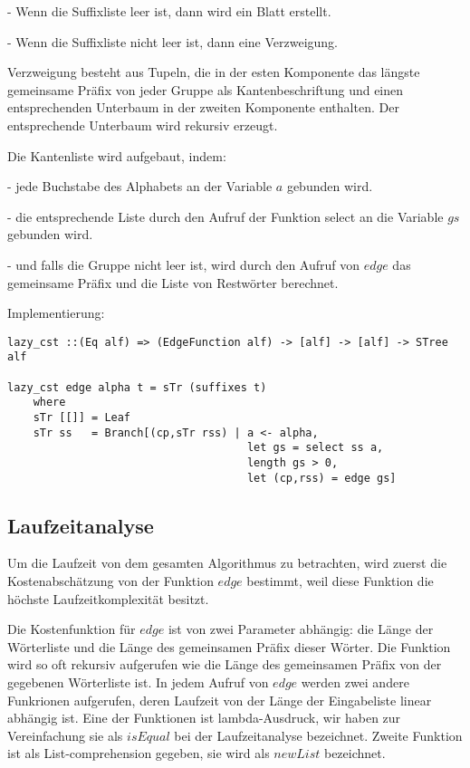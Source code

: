 \documentclass[12pt]{report}
\begin{document}
    - Wenn die Suffixliste leer ist, dann wird ein Blatt erstellt.

    - Wenn die Suffixliste nicht leer ist, dann eine Verzweigung.

Verzweigung besteht aus Tupeln, die in der esten Komponente das längste gemeinsame Präfix von jeder Gruppe als Kantenbeschriftung und einen entsprechenden Unterbaum in der zweiten Komponente enthalten. Der entsprechende Unterbaum wird rekursiv erzeugt.

Die Kantenliste wird aufgebaut, indem:

    - jede Buchstabe des Alphabets an der Variable $a$ gebunden wird.

    - die entsprechende Liste durch den Aufruf der Funktion select an die Variable $gs$ gebunden wird.

    - und falls die Gruppe nicht leer ist, wird durch den Aufruf von $edge$ das gemeinsame Präfix und die Liste von Restwörter berechnet.

Implementierung:
\begin{lstlisting}
lazy_cst ::(Eq alf) => (EdgeFunction alf) -> [alf] -> [alf] -> STree alf

lazy_cst edge alpha t = sTr (suffixes t)
    where
    sTr [[]] = Leaf
    sTr ss   = Branch[(cp,sTr rss) | a <- alpha,
                                     let gs = select ss a,
                                     length gs > 0,
                                     let (cp,rss) = edge gs]
\end{lstlisting}

\subsection{Laufzeitanalyse}
\label{sec:Laufzeitanalyse}

Um die Laufzeit von dem gesamten Algorithmus zu betrachten, wird zuerst die Kostenabschätzung von der Funktion $edge$ bestimmt, weil diese Funktion die höchste Laufzeitkomplexität besitzt.

Die Kostenfunktion für $edge$ ist von zwei Parameter abhängig: die Länge der Wörterliste und die Länge des gemeinsamen Präfix dieser Wörter. Die Funktion wird so oft rekursiv aufgerufen wie die Länge des gemeinsamen Präfix von der gegebenen Wörterliste ist. In jedem Aufruf von $edge$ werden zwei andere Funkrionen aufgerufen, deren Laufzeit von der Länge der Eingabeliste linear abhängig ist. Eine der Funktionen ist lambda-Ausdruck, wir haben zur Vereinfachung sie als $isEqual$ bei der Laufzeitanalyse bezeichnet. Zweite Funktion ist als List-comprehension gegeben, sie wird als $newList$ bezeichnet.
\end{document}
